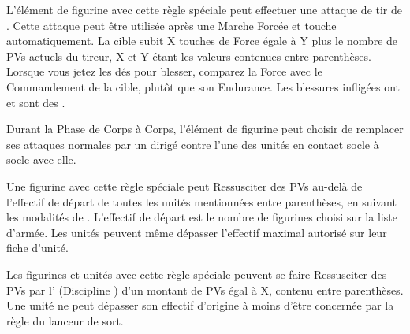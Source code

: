 

L'élément de figurine avec cette règle spéciale peut effectuer une attaque  de tir de . Cette attaque peut être utilisée après une Marche Forcée et touche automatiquement. La cible subit X touches de Force égale à Y plus le nombre de PVs actuels du tireur, X et Y étant les valeurs contenues entre parenthèses. Lorsque vous jetez les dés pour blesser, comparez la Force avec le Commandement de la cible, plutôt que son Endurance. Les blessures infligées ont  et sont des \magicalattacks{}.

Durant la Phase de Corps à Corps, l'élément de figurine peut choisir de remplacer ses attaques normales par un \chillingshriek{} dirigé contre l'une des unités en contact socle à socle avec elle.


Une figurine avec cette règle spéciale peut Ressusciter des PVs au-delà de l'effectif de départ de toutes les unités mentionnées entre parenthèses, en suivant les modalités de \raisewounds . L'effectif de départ est le nombre de figurines choisi sur la liste d'armée. Les unités peuvent même dépasser l'effectif maximal autorisé sur leur fiche d'unité.


Les figurines et unités avec cette règle spéciale peuvent se faire Ressusciter des PVs par l'\necromancysignaturespell{} (Discipline \necromancy{}) d'un montant de PVs égal à X, contenu entre parenthèses. Une unité ne peut dépasser son effectif d'origine à moins d'être concernée par la règle \awaken{} du lanceur de sort.

\armyspecialruleentry{\reaper}



